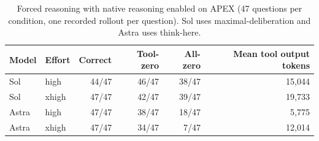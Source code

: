 \begin{table}[t]
\centering
\caption{Forced reasoning with native reasoning enabled on APEX (47 questions per condition, one recorded rollout per question). Sol uses maximal-deliberation and Astra uses think-here. }
\label{tab:live-channel-apex}
\scriptsize
\setlength{\tabcolsep}{4pt}
\begin{tabular}{llrrrr}
\toprule
Model & Effort & Correct & Tool-zero & All-zero & Mean tool output tokens \\
\midrule
Sol & high & 44/47 & 46/47 & 38/47  & 15,044 \\
Sol & xhigh & 47/47 & 42/47 & 39/47 & 19,733 \\
Astra & high & 47/47 & 38/47 & 18/47  & 5,775 \\
Astra & xhigh & 47/47 & 34/47 & 7/47  & 12,014 \\
\bottomrule
\end{tabular}
\end{table}
